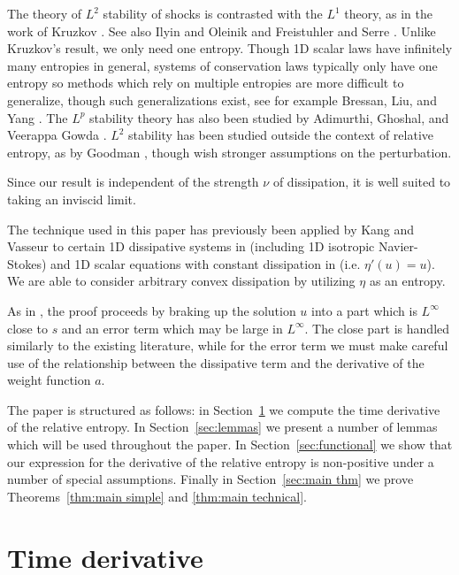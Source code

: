 The theory of $L^2$ stability of shocks is contrasted with the $L^1$ theory, as in the work of Kruzkov \cite{Kr.entropy}.  See also Ilyin and Oleinik \cite{IlOl} and Freistuhler and Serre \cite{FrSe}.  Unlike Kruzkov's result, we only need one entropy.  Though 1D scalar laws have infinitely many entropies in general, systems of conservation laws typically only have one entropy so methods which rely on multiple entropies are more difficult to generalize, though such generalizations exist, see for example Bressan, Liu, and Yang \cite{BrLiYa}.  The $L^p$ stability theory has also been studied by Adimurthi, Ghoshal, and Veerappa Gowda \cite{AdGhVG}.  $L^2$ stability has been studied outside the context of relative entropy, as by Goodman \cite{Go}, though wish stronger assumptions on the perturbation.  

Since our result is independent of the strength $\nu$ of dissipation, it is well suited to taking an inviscid limit.  

The technique used in this paper has previously been applied by Kang and Vasseur to certain 1D dissipative systems in \cite{KaVa.navier} (including 1D isotropic Navier-Stokes) and 1D scalar equations with constant dissipation in \cite{Ka} (i.e. $\eta'(u)=u$).  We are able to consider arbitrary convex dissipation by utilizing $\eta$ as an entropy.  

As in \cite{KaVa.navier}, the proof proceeds by braking up the solution $u$ into a part which is $L^\infty$ close to $s$ and an error term which may be large in $L^\infty$.  The close part is handled similarly to the existing literature, while for the error term we must make careful use of the relationship between the dissipative term and the derivative of the weight function $a$.  

The paper is structured as follows: in Section~\ref{sec:prelim} we compute the time derivative of the relative entropy.  In Section~\ref{sec:lemmas} we present a number of lemmas which will be used throughout the paper.  In Section~\ref{sec:functional} we show that our expression for the derivative of the relative entropy is non-positive under a number of special assumptions.  Finally in Section~\ref{sec:main thm} we prove Theorems~\ref{thm:main simple} and \ref{thm:main technical}.  

\section{Time derivative} \label{sec:prelim}

